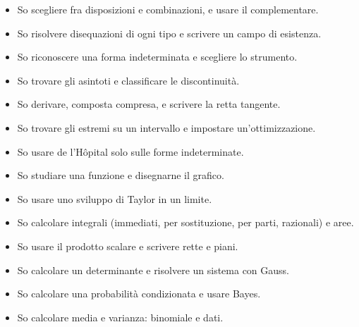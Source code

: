 \begin{tcolorbox}[enhanced,colback=white,colframe=alge!80!black,colbacktitle=alge!80!black,boxrule=0.8pt,arc=5pt,
  left=6pt,right=6pt,top=2pt,bottom=3pt,fontupper=\footnotesize,fonttitle=\hfb,coltitle=white,toptitle=1pt,bottomtitle=1pt,
  title={\faCheck\enspace Lista di controllo del corso},before skip=2pt]
\begin{multicols}{4}
\raggedright
\begin{itemize}[label={\textcolor{alge!80!black}{\faSquare[regular]}},leftmargin=1.4em,itemsep=0.5pt]
\item So scegliere fra disposizioni e combinazioni, e usare il complementare.
\item So risolvere disequazioni di ogni tipo e scrivere un campo di esistenza.
\item So riconoscere una forma indeterminata e scegliere lo strumento.
\item So trovare gli asintoti e classificare le discontinuità.
\item So derivare, composta compresa, e scrivere la retta tangente.
\item So trovare gli estremi su un intervallo e impostare un'ottimizzazione.
\item So usare de l'Hôpital solo sulle forme indeterminate.
\item So studiare una funzione e disegnarne il grafico.
\item So usare uno sviluppo di Taylor in un limite.
\item So calcolare integrali (immediati, per sostituzione, per parti, razionali) e aree.
\end{itemize}
\begin{itemize}[label={\textcolor{alge!55}{\faSquare[regular]}},leftmargin=1.4em,itemsep=0.5pt]
\item \textcolor{inchiostro!70}{So usare il prodotto scalare e scrivere rette e piani.} \textcolor{line!70}{\clessidra}
\item \textcolor{inchiostro!70}{So calcolare un determinante e risolvere un sistema con Gauss.} \textcolor{line!70}{\clessidra}
\item \textcolor{inchiostro!70}{So calcolare una probabilità condizionata e usare Bayes.} \textcolor{prob!70}{\clessidra}
\item \textcolor{inchiostro!70}{So calcolare media e varianza: binomiale e dati.} \textcolor{prob!70}{\clessidra}
\end{itemize}
\end{multicols}
\end{tcolorbox}


